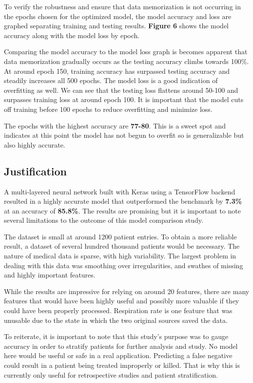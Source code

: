 \documentclass[11pt]{article}
\begin{document}
    To verify the robustness and ensure that data memorization is not occurring in the epochs chosen for the optimized model, the model accuracy and loss are graphed separating training and testing results. \textbf{Figure 6} shows the model accuracy along with the model loss by epoch.

	Comparing the model accuracy to the model loss graph is becomes apparent that data memorization gradually occurs as the testing accuracy climbs towards 100\%. At around epoch 150, training accuracy has surpassed testing accuracy and steadily increases all 500 epochs. The model loss is a good indication of overfitting as well. We can see that the testing loss flattens around 50-100 and surpasses training loss at around epoch 100. It is important that the model cuts off training before 100 epochs to reduce overfitting and minimize loss. 

	The epochs with the highest accuracy are \textbf{77-80}. This is a sweet spot and indicates at this point the model has not begun to overfit so is generalizable but also highly accurate.

	
	\subsection{Justification}
	
    A multi-layered neural network built with Keras using a TensorFlow backend resulted in a highly accurate model that outperformed the benchmark by \textbf{7.3\%} at an accuracy of \textbf{85.8\%}. The results are promising but it is important to note several limitations to the outcome of this model comparison study. 

	The dataset is small at around 1200 patient entries. To obtain a more reliable result, a dataset of several hundred thousand patients would be necessary. The nature of medical data is sparse, with high variability. The largest problem in dealing with this data was smoothing over irregularities, and swathes of missing and highly important features.

	While the results are impressive for relying on around 20 features, there are many features that would have been highly useful and possibly more valuable if they could have been properly processed. Respiration rate is one feature that was unusable due to the state in which the two original sources saved the data.

	To reiterate, it is important to note that this study's purpose was to gauge accuracy in order to stratify patients for further analysis and study. No model here would be useful or safe in a real application. Predicting a false negative could result in a patient being treated improperly or killed. That is why this is currently only useful for retrospective studies and patient stratification.
\end{document}
